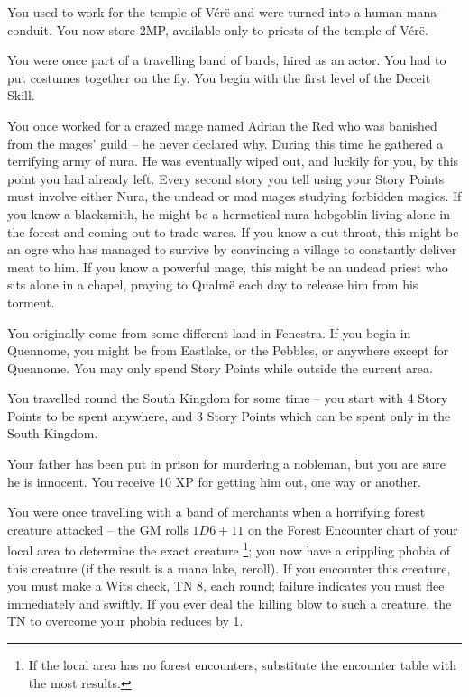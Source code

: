 \begin{multicols}{2}
\begin{list}{\addtocounter{list}{1}\textbf{:}}{\raggedleft}
	\item
	You used to work for the temple of V\'{e}r\"{e} and were turned into a human mana-conduit.
	You now store 2MP, available only to priests of the temple of V\'{e}r\"{e}.

	\item
	You were once part of a travelling band of bards, hired as an actor.
	You had to put costumes together on the fly.
	You begin with the first level of the Deceit Skill.

	\item
	You once worked for a crazed mage named Adrian the Red who was banished from the mages' guild -- he never declared why.
	During this time he gathered a terrifying army of nura.
	He was eventually wiped out, and luckily for you, by this point you had already left.
	Every second story you tell using your Story Points must involve either Nura, the undead or mad mages studying forbidden magics.
	If you know a blacksmith, he might be a hermetical nura hobgoblin living alone in the forest and coming out to trade wares.
	If you know a cut-throat, this might be an ogre who has managed to survive by convincing a village to constantly deliver meat to him.
	If you know a powerful mage, this might be an undead priest who sits alone in a chapel, praying to Qualm\"{e} each day to release him from his torment.

	\item
	You originally come from some different land in Fenestra.
	If you begin in Quennome, you might be from Eastlake, or the Pebbles, or anywhere except for Quennome.
	You may only spend Story Points while outside the current area.

	\item
	You travelled round the South Kingdom for some time -- you start with 4 Story Points to be spent anywhere, and 3 Story Points which can be spent only in the South Kingdom.

	\item
	Your father has been put in prison for murdering a nobleman, but you are sure he is innocent.
	You receive 10 XP for getting him out, one way or another.

	\item
	You were once travelling with a band of merchants when a horrifying forest creature attacked -- the GM rolls $1D6+11$ on the Forest Encounter chart of your local area to determine the exact creature%
	\footnote{If the local area has no forest encounters, substitute the encounter table with the most results.};
	you now have a crippling phobia of this creature (if the result is a mana lake, reroll).
	If you encounter this creature, you must make a Wits check, TN 8, each round; failure indicates you must flee immediately and swiftly.
	If you ever deal the killing blow to such a creature, the TN to overcome your phobia reduces by 1.


\end{list}
\end{multicols}
